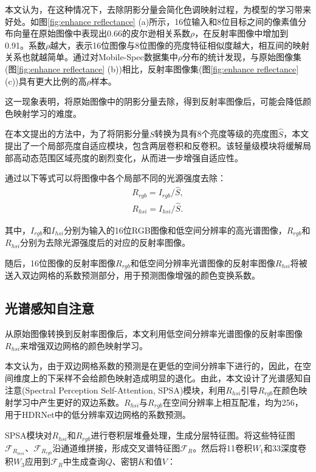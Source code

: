 \documentclass[
    type = master, %
    degree = academic,        %
    decl-page,  %
  ]{njuthesis}
\begin{document}
本文认为，在这种情况下，去除阴影分量会简化色调映射过程，为模型的学习带来好处。如图\ref{fig:enhance reflectance} (a)所示，16位输入和8位目标之间的像素值分布向量在原始图像中表现出0.66的皮尔逊相关系数$ρ$，在反射率图像中增加到0.91。系数$ρ$越大，表示16位图像与8位图像的亮度特征相似度越大，相互间的映射关系也就越简单。通过对Mobile-Spec数据集中$ρ$分布的统计发现，与原始图像集(图\ref{fig:enhance reflectance} (b))相比，反射率图像集(图\ref{fig:enhance reflectance} (c))具有更大比例的高$ρ$样本。

这一现象表明，将原始图像中的阴影分量去除，得到反射率图像后，可能会降低颜色映射学习的难度。

在本文提出的方法中，为了将阴影分量$S$转换为具有8个亮度等级的亮度图$\hat{S}$，本文提出了一个局部亮度自适应模块，包含两层卷积和反卷积。该轻量级模块将缓解局部高动态范围区域亮度的剧烈变化，从而进一步增强自适应性。

通过以下等式可以将图像中各个局部不同的光源强度去除：
\begin{equation}
\begin{aligned}
R_{r g b}=I_{r g b} / \hat{S}, \\
R_{hsi}=I_{hsi} / \hat{S}.
\end{aligned}
\end{equation}

其中，$I_{r g b}$和$I_{hsi}$分别为输入的16位RGB图像和低空间分辨率的高光谱图像，$R_{r g b}$和$R_{hsi}$分别为去除光源强度后的对应的反射率图像。

随后，16位图像的反射率图像$R_{r g b}$和低空间分辨率光谱图像的反射率图像$R_{hsi}$将被送入双边网格的系数预测部分，用于预测图像增强的颜色变换系数。



\subsection{光谱感知自注意}
从原始图像转换到反射率图像后，本文利用低空间分辨率光谱图像的反射率图像$R_{hsi}$来增强双边网格的颜色映射学习。

本文认为，由于双边网格系数的预测是在更低的空间分辨率下进行的，因此，在空间维度上的下采样不会给颜色映射造成明显的退化。由此，本文设计了光谱感知自注意(Spectral Perception Self-Attention, SPSA)模块，利用$R_{hsi}$引导$R_{rgb}$在颜色映射学习中产生更好的双边系数。$R_{hsi}$与$R_{rgb}$在空间分辨率上相互配准，均为256，用于HDRNet中的低分辨率双边网格的系数预测。

SPSA模块对$R_{hsi}$和$R_{rgb}$进行卷积层堆叠处理，生成分层特征图。将这些特征图$\mathcal{F}_{R_{msi}}$、$\mathcal{F}_{R_{rgb}}$沿通道维拼接，形成交叉谱特征图$\mathcal{F}_{R}$。然后将1\times1卷积$W_1$和3\times3深度卷积$W_3$应用到$\mathcal{F}_{R}$中生成查询$Q$、密钥$K$和值$V$：
\end{document}
